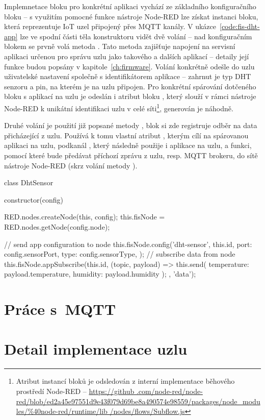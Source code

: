 Implemnetace bloku pro konkrétní aplikaci vychází ze základního konfiguračního bloku -- s využitím pomocné funkce
nástroje Node-RED  lze získat instanci bloku, která reprezentuje IoT uzel připojený přes MQTT
kanály.
V ukázce~\ref{code:fis-dht-app} lze ve spodní části těla konstruktoru vidět dvě volání -- nad konfiguračním blokem se
prvně volá metoda .
Tato metoda zajišťuje napojení na servisní aplikaci určenou pro správu uzlu jako takového a dalších aplikací --
detaily její funkce budou popsány v kapitole~\ref{ch:firmware}.
Volání konkrétně odešle do uzlu uživatelské nastavení společně s identifikátorem aplikace  -- zahrnut
je typ DHT senzoru a pin, na kterém je na uzlu připojen.
Pro konkrétní spárování dotčeného bloku s aplikací na uzlu je odeslán i atribut bloku , který slouží v
rámci nástroje Node-RED k unikátní identifikaci uzlu v celé síti\footnote{Atribut  instancí bloků je
odsledován z interní implementace běhového prostředí Node-RED -- \url{https://github
.com/node-red/node-red/blob/ed2a45e97551d9e43f079d69be8a490574e98559/packages/node_modules/\%40node-red/runtime/lib
/nodes/flows/Subflow.js}}, generován je náhodně.

Druhé volání je použití již popsané metody , blok si zde registruje odběr na data přicházející z
uzlu.
Používá k tomu vlastní atribut , kterým cílí na spárovanou aplikaci na uzlu, podkanál , který
následně použije i aplikace na uzlu, a funkci, pomocí které bude předávat příchozí zprávu z uzlu, resp. MQTT brokeru,
do sítě nástroje Node-RED (skrz volání metody ).

\begin{code}[
    language=Javascript,
    label=code:fis-dht-app,
    caption={Detail implementace vstupní aplikace (z hlediska centrálního uzlu) -- konkrétně se jedná o aplikaci pro
senzory typu DHT měřící teplotu a vlhkost okolí. }
]
class DhtSensor {
    constructor(config) {
        RED.nodes.createNode(this, config);
        this.fisNode = RED.nodes.getNode(config.node);

        // send app configuration to node
        this.fisNode.config('dht-sensor', this.id, {
            port: config.sensorPort,
            type: config.sensorType,
        });
        // subscribe data from node
        this.fisNode.appSubscribe(this.id, (topic, payload) => {
            this.send({
                temperature: payload.temperature,
                humidity: payload.humidity
            });
        }, 'data');
    }
}
\end{code}


\section{Práce s~MQTT}

\section{Detail implementace uzlu}
